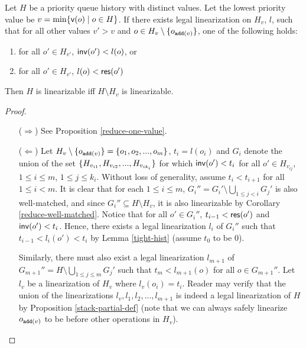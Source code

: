 \begin{lemma}
    Let $H$ be a priority queue history with distinct values. Let the lowest priority value be $v = \min\{{\sf v}(o) \;|\; o\in H\}$. If there exists legal linearization on $H_v$, $l$, such that for all other values $v' > v$ and $o \in H_v \setminus \{o_{{\tt add}(v)}\}$, one of the following holds:
    \begin{enumerate}
        \item for all $o' \in H_{v'}$, ${\sf inv}(o') < l(o)$, or
        \item for all $o' \in H_{v'}$, $l(o) < {\sf res}(o')$
    \end{enumerate}
    Then $H$ is linearizable iff $H \setminus H_v$ is linearizable.
\end{lemma}
\begin{proof}
    \begin{itemize}
        \item[($\Rightarrow$)] See Proposition \ref{reduce-one-value}.
        \item[($\Leftarrow$)] Let $H_v \setminus \{o_{{\tt add}(v)}\} = \{o_1, o_2, ..., o_m\}$, $t_i = l(o_i)$ and $G_i$ denote the union of the set $\{H_{v_{i1}}, H_{v_{i2}}, ..., \allowbreak H_{v_{ik_i}}\}$ for which ${\sf inv}(o') < t_i$ for all $o' \in H_{v_{ij}}$, $1 \leq i \leq m$, $1 \leq j \leq k_i$. Without loss of generality, assume $t_i < t_{i+1}$ for all $1 \leq i < m$. It is clear that for each $1 \leq i \leq m$, $G_i'' = G_i' \setminus \bigcup_{1\leq j < i}{G_j'}$ is also well-matched, and since $G_i'' \subseteq H \setminus H_v$, it is also linearizable by Corollary \ref{reduce-well-matched}. Notice that for all $o'\in G_i''$, $t_{i-1} < {\sf res}(o')$ and ${\sf inv}(o') < t_i$. Hence, there exists a legal linearization $l_i$ of $G_i''$ such that $t_{i-1} < l_i(o') < t_i$ by Lemma \ref{tight-hist} (assume $t_0$ to be 0).

Similarly, there must also exist a legal linearization $l_{m+1}$ of $G_{m+1}'' = H \setminus \bigcup_{1\leq j \leq m}{G_j'}$ such that $t_m < l_{m+1}(o)$ for all $o \in G_{m+1}''$. Let $l_v$ be a linearization of $H_v$ where $l_v(o_i) = t_i$. Reader may verify that the union of the linearizations $l_v, l_1, l_2, ..., l_{m+1}$ is indeed a legal linearization of $H$ by Proposition \ref{stack-partial-def} (note that we can always safely linearize $o_{{\tt add}(v)}$ to be before other operations in $H_v$).
    \end{itemize}
\end{proof}

